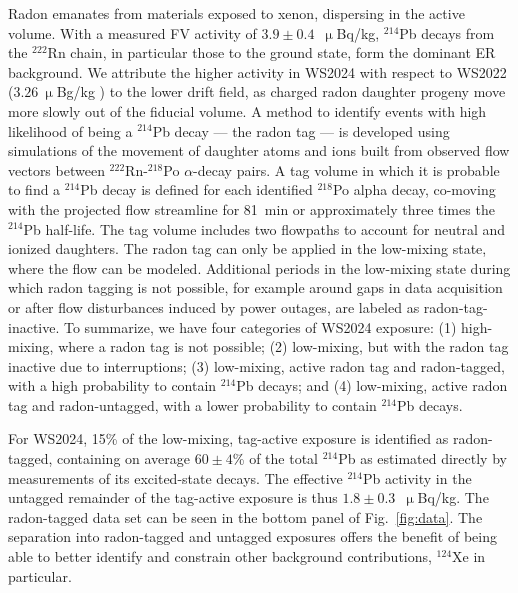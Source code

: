 \documentclass[%
 reprint,
 superscriptaddress,
 amsmath,amssymb,
 prl,
floatfix,
]{revtex4-2}
\newcommand{\RevA}[1]{{\color{black}#1}}
\begin{document}
Radon emanates from materials exposed to xenon, dispersing in the active volume. With a measured FV activity of $3.9\pm0.4$~$\upmu$Bq/kg, $^{214}$Pb decays from the $^{222}$Rn chain, in particular those to the ground state, form the dominant ER background. \RevA{We attribute the higher activity in WS2024 with respect to WS2022 ($3.26~\upmu$Bg/kg \cite{LZ-backgrounds}) to the lower drift field, as charged radon daughter progeny move more slowly out of the fiducial volume.} A method to identify events with high likelihood of being a $^{214}$Pb decay --- the radon tag --- is developed using simulations of the movement of daughter atoms and ions built from observed flow vectors between $^{222}$Rn-$^{218}$Po $\alpha$-decay pairs. A tag volume in which it is probable to find a $^{214}$Pb decay is defined for each identified $^{218}$Po alpha decay, co-moving with the projected flow streamline for 81~min or approximately three times the $^{214}$Pb half-life. \RevA{The tag volume includes two flowpaths to account for neutral and ionized daughters. The radon tag can only be applied in the low-mixing state, where the flow can be modeled. Additional periods in the low-mixing state during which radon tagging is not possible, for example around gaps in data acquisition or after flow disturbances induced by power outages, are labeled as radon-tag-inactive. 
To summarize, we have four categories of WS2024 exposure: (1) high-mixing, where a radon tag is not possible; (2) low-mixing, but with the radon tag inactive due to interruptions; (3) low-mixing, active radon tag and radon-tagged, with a high probability to contain $^{214}$Pb decays; and (4) low-mixing, active radon tag and radon-untagged, with a lower probability to contain $^{214}$Pb decays.} 
 
 \RevA{For WS2024, 15\% of the low-mixing, tag-active exposure is identified as radon-tagged, containing on average $60\pm4$\% of the total $^{214}$Pb as estimated directly by measurements of its excited-state decays.}
The effective $^{214}$Pb activity in the untagged remainder of the tag-active exposure is thus $1.8\pm0.3$~$\upmu$Bq/kg. \RevA{The radon-tagged data set can be seen in the bottom panel of Fig.~\ref{fig:data}.}
The separation into \RevA{radon-tagged and untagged} exposures offers the benefit of being able to better identify and constrain other background contributions, $^{124}$Xe in particular. 
\end{document}
